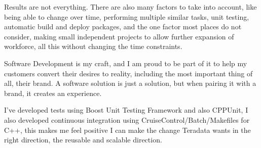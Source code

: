 Results are not everything. There are also many factors to take into account, like being able to change over time, performing multiple similar tasks, unit testing, automatic build and deploy packages, and the one factor most places do not consider, making small independent projects to allow further expansion of workforce, all this without changing the time constraints.

Software Development is my craft, and I am proud to be part of it to help my customers convert their desires to reality, including the most important thing of all, their brand. A software solution is just a solution, but when pairing it with a brand, it creates an experience. 

I've developed tests using Boost Unit Testing Framework and also CPPUnit, I also developed continuous integration using CruiseControl/Batch/Makefiles for C++, this makes me feel positive I can make the change Teradata wants in the right direction, the reusable and scalable direction.

